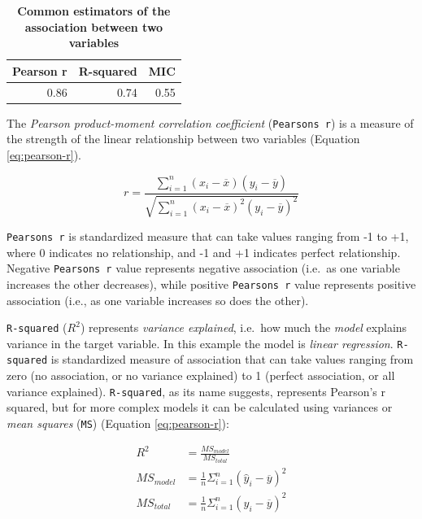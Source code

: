 \documentclass[
]{book}
\begin{document}
\begin{table}

\caption{\label{tab:common-estimators-association}\textbf{Common estimators of the association between two variables}}
\centering
\begin{tabular}[t]{rrr}
\toprule
Pearson r & R-squared & MIC\\
\midrule
0.86 & 0.74 & 0.55\\
\bottomrule
\end{tabular}
\end{table}

The \emph{Pearson product-moment correlation coefficient} (\texttt{Pearson\textquotesingle{}s\ r}) is a measure of the strength of the linear relationship between two variables (Equation \eqref{eq:pearson-r}).

\begin{equation}
  r = \frac{{}\sum_{i=1}^{n} (x_i - \overline{x})(y_i - \overline{y})}
  {\sqrt{\sum_{i=1}^{n} (x_i - \overline{x})^2(y_i - \overline{y})^2}}
  \label{eq:pearson-r}
\end{equation}

\texttt{Pearson\textquotesingle{}s\ r} is standardized measure that can take values ranging from -1 to +1, where 0 indicates no relationship, and -1 and +1 indicates perfect relationship. Negative \texttt{Pearson\textquotesingle{}s\ r} value represents negative association (i.e.~as one variable increases the other decreases), while positive \texttt{Pearson\textquotesingle{}s\ r} value represents positive association (i.e., as one variable increases so does the other).

\texttt{R-squared} (\(R^2\)) represents \emph{variance explained}, i.e.~how much the \emph{model} explains variance in the target variable. In this example the model is \emph{linear regression}. \texttt{R-squared} is standardized measure of association that can take values ranging from zero (no association, or no variance explained) to 1 (perfect association, or all variance explained). \texttt{R-squared}, as its name suggests, represents Pearson's r squared, but for more complex models it can be calculated using variances or \emph{mean squares} (\texttt{MS}) (Equation \eqref{eq:pearson-r}):

\begin{equation}
  \begin{split}
    R^2 &= \frac{MS_{model}}{MS_{total}} \\
    MS_{model} &= \frac{1}{n}\Sigma_{i=1}^{n}(\hat y_i - \overline y)^2 \\
    MS_{total} &= \frac{1}{n}\Sigma_{i=1}^{n}(y_i - \overline y)^2
  \end{split}
  \label{eq:r-squared}
\end{equation}
\end{document}
